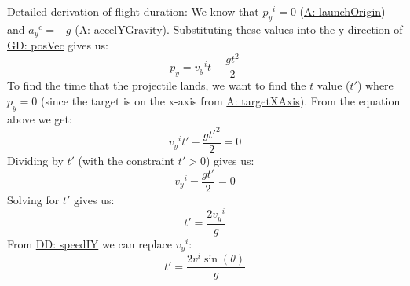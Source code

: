 \documentclass[12pt]{article}
\begin{document}
Detailed derivation of flight duration:
We know that ${{p_{y}}^{i}}=0$ (\hyperref[launchOrigin]{A: launchOrigin}) and ${{a_{y}}^{c}}=-g$ (\hyperref[accelYGravity]{A: accelYGravity}). Substituting these values into the y-direction of \hyperref[GD:posVec]{GD: posVec} gives us:
\begin{displaymath}
{p_{y}}={{v_{y}}^{i}} t-\frac{g t^{2}}{2}
\end{displaymath}
To find the time that the projectile lands, we want to find the $t$ value ($t'$) where ${p_{y}}=0$ (since the target is on the x-axis from \hyperref[targetXAxis]{A: targetXAxis}). From the equation above we get:
\begin{displaymath}
{{v_{y}}^{i}} t'-\frac{g t'^{2}}{2}=0
\end{displaymath}
Dividing by $t'$ (with the constraint $t'>0$) gives us:
\begin{displaymath}
{{v_{y}}^{i}}-\frac{g t'}{2}=0
\end{displaymath}
Solving for $t'$ gives us:
\begin{displaymath}
t'=\frac{2 {{v_{y}}^{i}}}{g}
\end{displaymath}
From \hyperref[DD:speedIY]{DD: speedIY} we can replace ${{v_{y}}^{i}}$:
\begin{displaymath}
t'=\frac{2 {v^{i}} \sin\left(θ\right)}{g}
\end{displaymath}
\par~
\end{document}

